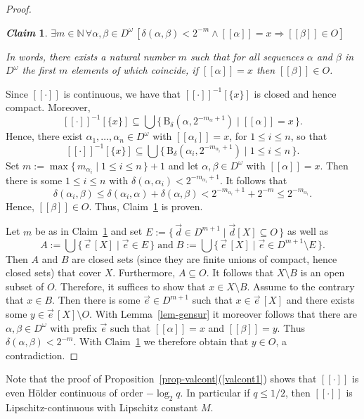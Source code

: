 \documentclass[microtype]{jloganal}
\newtheorem{claim}{\it Claim}
\theoremstyle{plain}
\theoremstyle{definition}
\newcommand{\NN}{\mathbb{N}}
\newcommand{\ball}[3]{\mathrm{B}_{#1}(#2,#3)}
\newcommand{\val}[1]{[\![#1]\!]}
\newcommand{\set}[2]{\mbox{$\{\,#1 \mid #2 \,\}$}}
\begin{document}
\begin{proof}
\begin{claim}
\label{cl-qtop-1}
$\exists m \in \NN\, \forall \alpha, \beta \in D^\omega \,[\delta(\alpha, \beta) < 2^{-m} \wedge \val{\alpha} = x \Rightarrow \val{\beta} \in O]$

In words, there exists a natural number $m$ such that for all sequences $\alpha$ and $\beta$ in $D^\omega$ the first $m$ elements of which coincide, if $\val{\alpha} = x$ then $\val{\beta} \in O$.
\end{claim}

Since $\val{\cdot}$ is continuous, we have that $\val{\cdot}^{-1}[\{ x \}]$ is closed and hence compact. Moreover,
\[
\val{\cdot}^{-1}[\{ x \}] \subseteq \bigcup \set{\ball{\delta}{\alpha}{2^{-{m_\alpha}+1}}}{\val{\alpha} = x}.
\]
Hence, there exist $\alpha_1, \ldots, \alpha_n \in D^\omega$ with $\val{\alpha_i} = x$, for $1 \le i \le n$, so that
\[
\val{\cdot}^{-1}[\{ x \}] \subseteq \bigcup \set{\ball{\delta}{\alpha_i}{2^{-{m_{\alpha_i}}+1}}}{1 \le i \le n}.
\]
Set $m := \max \set{m_{\alpha_i}}{1 \le i \le n} + 1$ and let $\alpha, \beta \in D^\omega$ with $\val{\alpha} = x$. Then there is some $1 \le i \le n$ with $\delta(\alpha, \alpha_i) < 2^{-m_{\alpha_i}+1}$. It follows that
\[
\delta(\alpha_i, \beta) \le \delta(\alpha_i, \alpha) + \delta(\alpha, \beta) < 2^{-m_{\alpha_i}+1} + 2^{-m} \le 2^{-m_{\alpha_i}}.
\]
Hence, $\val{\beta} \in O$. Thus, Claim~\ref{cl-qtop-1} is proven.

Let $m$ be as in Claim~\ref{cl-qtop-1} and set 
$
E := \set{\vec d \in D^{m+1}}{\vec d [X] \subseteq O}
$
as well as 
\[ A := \bigcup\set{\vec e \,[X]}{\vec e \in E}\;\text{and}\;
   B := \bigcup\set{\vec e \,[X]}{\vec e \in D^{m+1}\setminus E}.
\]
Then $A$ and $B$ are closed sets (since they are finite unions
of compact, hence closed sets) that cover $X$. Furthermore, $A\subseteq O$.
It follows that $X\setminus B$ is an open subset of $O$. Therefore, it suffices
to show that $x\in X\setminus B$.
Assume to the contrary that $x\in B$. Then there is some $\vec e\in D^{m+1}$
such that $x \in \vec{e}\,[X]$ and there exists some 
$y \in \vec{e}\,[X] \setminus O$. 
With Lemma~\ref{lem-gensur} it moreover follows that there are 
$\alpha, \beta \in D^\omega$ with prefix $\vec e$ such that 
$\val{\alpha} = x$ and $\val{\beta} = y$. 
Thus $\delta(\alpha, \beta) < 2^{-m}$. With Claim~\ref{cl-qtop-1} 
we therefore obtain  that $y \in O$, a contradiction.
\end{proof}

Note that the proof of Proposition~\ref{prop-valcont}(\ref{valcont1}) shows that 
$\val{\cdot}$ is even H\"older continuous of order $-\log_2 q$. 
In particular if $q\le 1/2$, then $\val{\cdot}$ is Lipschitz-continuous 
with Lipschitz constant $M$.
\end{document}

